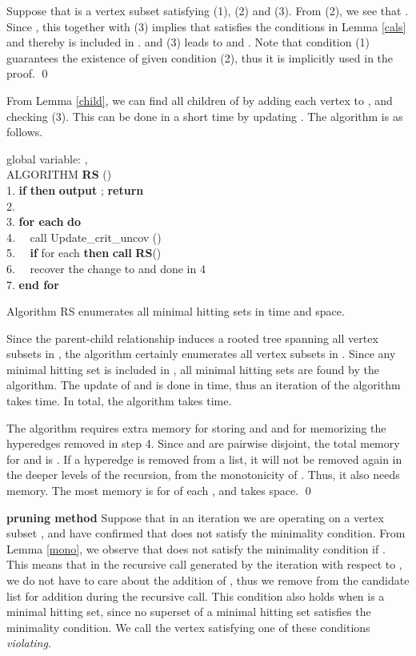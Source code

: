 Suppose that  is a vertex subset satisfying (1), (2) and (3).
From (2), we see that .
Since , this together with (3) implies that  satisfies
 the conditions in Lemma \ref{cals} and thereby is included in .
 and (3) leads to  and
 .
Note that condition (1) guarantees the existence of  given condition (2),
 thus it is implicitly used in the proof.
\qed 

From Lemma \ref{child}, we can find all children of  by adding each
 vertex  to , and checking (3).
This can be done in a short time by updating .
The algorithm is as follows.

\begin{tabbing}
global variable: , \\
ALGORITHM {\bf RS} ()\\
1. {\bf if}  {\bf then} {\bf output} ; {\bf return}\\
2. \\
3. {\bf for each}  {\bf do}\\
4. \ \ call Update\_crit\_uncov ()\\
5. \ \ {\bf if}  for each  {\bf then}
 {\bf call} {\bf RS}()\\
6. \ \ recover the change to  and  done in 4\\
7. {\bf end for}
\end{tabbing}

\begin{theorem}
Algorithm RS enumerates all minimal hitting sets in
  time and  space.
\end{theorem}

\proof
Since the parent-child relationship induces a rooted tree spanning all
 vertex subsets in , the algorithm certainly enumerates all vertex
 subsets in .
Since any minimal hitting set is included in , all minimal hitting
 sets are found by the algorithm.
The update of  and  is done in  time,
 thus an iteration of the algorithm takes  time.
In total, the algorithm takes  time.

The algorithm requires extra memory for storing  and 
 and for memorizing the hyperedges removed in step 4.
Since  and  are pairwise disjoint, the total memory for
  and  is .
If a hyperedge is removed from a list, it will not be removed again in
 the deeper levels of the recursion, from the monotonicity of .
Thus, it also needs  memory.
The most memory is for  of each , and takes
  space.
\qed\

\noindent
{\bf pruning method}
Suppose that in an iteration we are operating on a vertex subset , 
 and have confirmed that  does not satisfy the minimality condition.
From Lemma \ref{mono}, we observe that  does not satisfy the
 minimality condition if .
This means that in the recursive call generated by the iteration with
 respect to , we do not have to care about the addition of ,
 thus we remove  from the candidate list for addition during the
 recursive call.
This condition also holds when  is a minimal hitting set, 
 since no superset of a minimal hitting set satisfies the minimality condition.
We call the vertex  satisfying one of these conditions {\em violating}.

